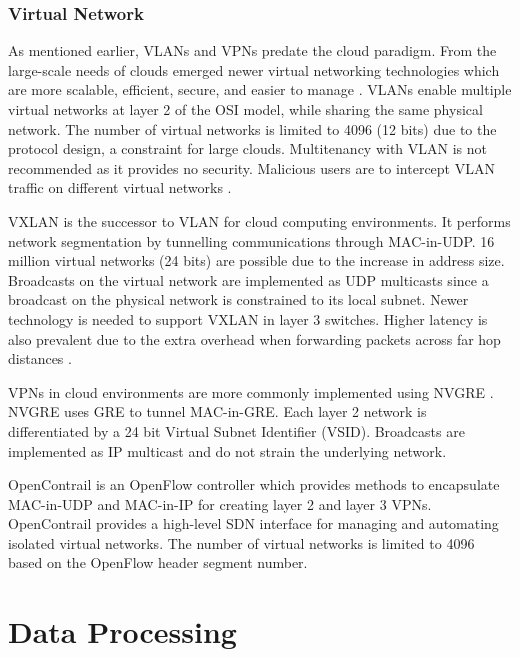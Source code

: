 \documentclass[12pt]{article}
\begin{document}
\subsubsection{Virtual Network}

As mentioned earlier, VLANs and VPNs predate the cloud paradigm. From the large-scale needs of clouds emerged newer virtual networking technologies which are more scalable, efficient, secure, and easier to manage \cite{wang2015survey}. VLANs enable multiple virtual networks at layer 2 of the OSI model, while sharing the same physical network. The number of virtual networks is limited to 4096 (12 bits) due to the protocol design, a constraint for large clouds. Multitenancy with VLAN is not recommended as it provides no security. Malicious users are to intercept VLAN traffic on different virtual networks \cite{vlanattacks}.

VXLAN \cite{vxlan} is the successor to VLAN for cloud computing environments. It performs network segmentation by tunnelling communications through MAC-in-UDP. 16 million virtual networks (24 bits) are possible due to the increase in address size. Broadcasts on the virtual network are implemented as UDP multicasts since a broadcast on the physical network is constrained to its local subnet. Newer technology is needed to support VXLAN in layer 3 switches. Higher latency is also prevalent due to the extra overhead when forwarding packets across far hop distances \cite{wang2015survey}.

VPNs in cloud environments are more commonly implemented using NVGRE \cite{nvgre}. NVGRE uses GRE to tunnel MAC-in-GRE. Each layer 2 network is differentiated by a 24 bit Virtual Subnet Identifier (VSID). Broadcasts are implemented as IP multicast and do not strain the underlying network.

OpenContrail \cite{opencontrail} is an OpenFlow controller which provides methods to encapsulate MAC-in-UDP and MAC-in-IP for creating layer 2 and layer 3 VPNs. OpenContrail provides a high-level SDN interface for managing and automating isolated virtual networks. The number of virtual networks is limited to 4096 based on the OpenFlow header segment number.








\section{Data Processing} \label{sec:data-processing}
\end{document}
